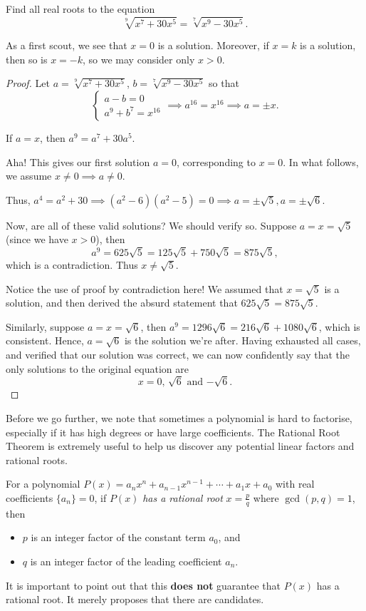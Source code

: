 \documentclass[../main.tex]{subfiles}
\begin{document}
\begin{example}[2021 SMO(O) P10]
Find all real roots to the equation
$$\sqrt[9]{x^7+30x^5}=\sqrt[7]{x^9-30x^5}.$$
\end{example}
As a first scout, we see that $x=0$ is a solution. Moreover, if $x=k$ is a solution, then so is $x=-k$, so we may consider only $x > 0$.
\begin{proof}
Let $a=\sqrt[9]{x^7+30x^5}$, $b=\sqrt[7]{x^9-30x^5}$ so that
$$\begin{cases}
    a-b=0 \\
    a^9+b^7=x^{16}
\end{cases}
\implies
a^{16}=x^{16} \implies a=\pm x.$$

If $a=x$, then $a^9=a^7+30a^5.$ 

Aha! This gives our first solution $a=0$, corresponding to $x=0$. In what follows, we assume $x\neq 0 \implies a\neq 0$.

Thus, $a^4=a^2+30 \implies (a^2-6)(a^2-5)=0 \implies a=\pm \sqrt{5}, a=\pm \sqrt{6}$.

Now, are all of these valid solutions? We should verify so. Suppose $a=x=\sqrt{5}$ (since we have $x>0$), then 
$$a^9=625\sqrt{5}=125\sqrt{5}+750\sqrt{5}=875\sqrt{5},$$ which is a contradiction. Thus $x\neq \sqrt{5}$.
\begin{remark}
Notice the use of proof by contradiction here! We assumed that $x=\sqrt{5}$ is a solution, and then derived the absurd statement that $625\sqrt{5}=875\sqrt{5}$.
\end{remark}
Similarly, suppose $a=x=\sqrt{6}$, then $a^9=1296\sqrt{6}=216\sqrt{6}+1080\sqrt{6}$, which is consistent. Hence, $a=\sqrt{6}$ is the solution we're after. Having exhausted all cases, and verified that our solution was correct, we can now confidently say that the only solutions to the original equation are $$\boxed{\text{$x=0$, $\sqrt{6}$ and $-\sqrt{6}$}}.$$
\end{proof}

Before we go further, we note that sometimes a polynomial is  hard to factorise, especially if it has high degrees or have large coefficients. The Rational Root Theorem is extremely useful to help us discover any potential linear factors and rational roots.
\begin{proposition}
For a polynomial $P(x)=a_nx^n+a_{n-1}x^{n-1}+\cdots+a_1x+a_0$ with real coefficients $\{a_n\}=0$, if $P(x)$ \textit{has a rational root} $x=\frac{p}{q}$ where $\gcd(p,q)=1$, then
\begin{itemize}
    \item $p$ is an integer factor of the constant term $a_0$, and
    \item $q$ is an integer factor of the leading coefficient $a_n$.
\end{itemize}
It is important to point out that this \textbf{does not} guarantee that $P(x)$ has a rational root. It merely proposes that there are candidates.
\end{proposition}
\end{document}
